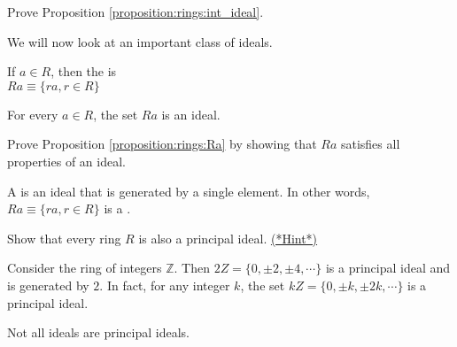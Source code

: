 \begin{exercise}\label{exercise:rings:int_ideal}
Prove Proposition \ref{proposition:rings:int_ideal}.
\end{exercise}

We will now look at an important class of ideals.

\begin{defn}\label{set_gen}
If $a\in R$, then the  is \\
$Ra\equiv \{ra, r\in R\}$
\end{defn}

\begin{prop}\label{proposition:rings:Ra}
For every $a\in R$, the set $Ra$ is an ideal.
\end{prop}

\begin{exercise}
Prove Proposition \ref{proposition:rings:Ra} by showing that $Ra$ satisfies all properties of an ideal.
\end{exercise}


\begin{defn}\label{principal_ideal}
A  is an ideal that is generated by a single element. In other words, $Ra\equiv \{ra,r\in R\}$ is a .
\end{defn}

\begin{exercise}\label{exercise:rings:ringIsPrId}
    Show that every ring $R$ is also a principal ideal. \hyperref[ringsHints]{(*Hint*)} 
\end{exercise}

\begin{example}
Consider the ring of integers ${\mathbb Z}$. Then $2Z=\{0,\displaystyle \pm 2,\displaystyle \pm 4,\cdots\}$ is a principal ideal and is generated by $2$.  In fact, for any integer $k$, the set  $kZ=\{0,\displaystyle \pm k,\displaystyle \pm 2k,\cdots\}$ is a principal ideal.
\end{example}


Not all ideals are principal ideals.

